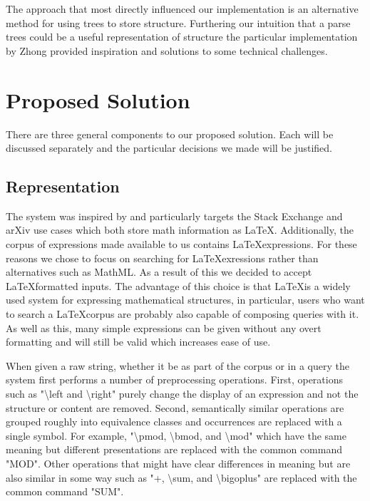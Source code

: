 \documentclass{sig-alternate}
\begin{document}
The approach that most directly influenced our implementation is an
alternative method for using trees to store structure. Furthering our
intuition that a parse trees could be a useful representation of structure
the particular implementation by Zhong provided inspiration and 
solutions to some technical challenges.\cite{zhong:cowpie}

\section{Proposed Solution}
There are three general components to our proposed solution.
Each will be discussed separately and the particular 
decisions we made will be justified. 

\subsection{Representation}
The system was inspired by and particularly targets the Stack Exchange
and arXiv use cases which both store math information as LaTeX. 
Additionally, the corpus of expressions made available to us contains
\LaTeX expressions. For these reasons we chose to focus on searching
for \LaTeX exressions rather than alternatives such as MathML. As a 
result of this we decided to accept \LaTeX formatted inputs. The advantage
of this choice is that \LaTeX is a widely used system for expressing
mathematical structures, in particular, users who want to search
a \LaTeX corpus are probably also capable of composing queries with it.
As well as this, many simple expressions can be given without any 
overt formatting and will still be valid which increases ease of use.

When given a raw string, whether it be as part of the corpus or in 
a query the system first performs a number of preprocessing operations.
First, operations such as "\textbackslash left and \textbackslash right"
purely change the display of an expression and not the structure or
content are removed. Second, semantically similar operations are grouped roughly into equivalence classes and occurrences are replaced with a single symbol. For example, "\textbackslash pmod, \textbackslash bmod, and \textbackslash mod" which have the same meaning but different 
presentations are replaced with the common command "MOD". Other
operations that might have clear differences in meaning but are also
similar in some way such as "+, \textbackslash sum, and \textbackslash bigoplus" are replaced with the common command "SUM".
\end{document}
